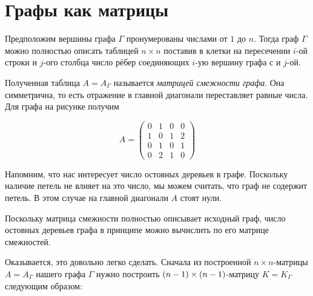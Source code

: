 \documentclass{article}
\begin{document}
\pagebreak[4]

\section{Графы как матрицы}


{

\begin{wrapfigure}{r}{32 mm}
\end{wrapfigure}

Предположим вершины графа $\Gamma$ пронумерованы числами от $1$ до $n$.
Тогда граф $\Gamma$ можно полностью описать таблицей $n\times n$ поставив в клетки на пересечении $i$-ой строки и $j$-ого столбца число рёбер соединяющих $i$-ую вершину графа с и $j$-ой.

}

Полученная таблица $A=A_\Gamma$ называется \emph{матрицей смежности графа}.
Она симметрична, то есть отражение в главной диагонали переставляет равные числа.
Для графа на рисунке получим 

\[A=\left(
\begin{matrix}
0&1&0&0
\\
1&0&1&2
\\
0&1&0&1
\\
0&2&1&0
\end{matrix}
\right)\]

Напомним, что нас интересует число остовных деревьев в графе.
Поскольку наличие петель не влияет на это число, мы можем считать, что граф не содержит петель.
В этом случае на главной диагонали $A$ стоят нули.

Поскольку матрица смежности полностью описывает исходный граф, 
число остовных деревьев графа в принципе можно вычислить по его матрице смежностей.

Оказывается, это довольно легко сделать.
Сначала из построенной $n\times n$-матрицы  $A=A_\Gamma$ нашего графа $\Gamma$ нужно построить $(n-1)\z\times(n-1)$-матрицу $K=K_\Gamma$ следующим образом: 
\end{document}
